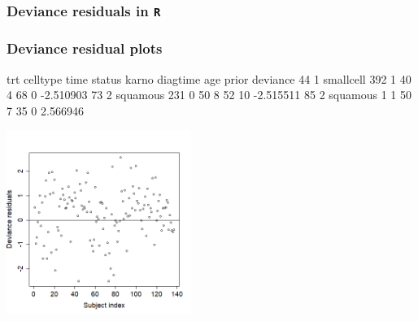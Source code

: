 \begin{frame}[fragile]
\frametitle{Deviance residuals in \texttt{R}}
\end{frame}

\begin{frame}[fragile]
\frametitle{Deviance residual plots}
\begin{Rout}{-0.05}
   trt  celltype time status karno diagtime age prior  deviance
44   1 smallcell  392      1    40        4  68     0 -2.510903
73   2  squamous  231      0    50        8  52    10 -2.515511
85   2  squamous    1      1    50        7  35     0  2.566946
\end{Rout}
\includegraphics[width=0.45\textwidth, clip, trim={0 0cm 0cm 0cm}]{Figures/deviance_residuals.png}
\end{frame}


